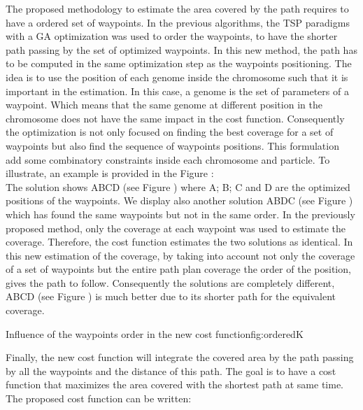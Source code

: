 The proposed methodology to estimate the area covered by the path requires to have a ordered set of waypoints.  In the previous algorithms, the TSP paradigms with a GA optimization was used to order the waypoints, to have the shorter path passing by the set of optimized waypoints. In this new method, the path has to be computed in the same optimization step as the waypoints positioning. 
The idea is to use the position of each genome inside the chromosome such that it is important in the estimation. In this case, a genome is the set of parameters of a waypoint. Which means that the same genome at different position in the chromosome does not have the same impact in the cost function. Consequently the optimization is not only focused on finding the best coverage for a set of waypoints but also find the sequence of waypoints positions. This formulation add some combinatory constraints inside each chromosome and particle.
To illustrate, an example is provided in the Figure  : \\
The solution shows ABCD (see Figure ) where A; B; C and D are the optimized positions of the waypoints. We display also another solution  ABDC (see Figure ) which has found the same waypoints but not in the same order. In the previously proposed method, only the coverage at each waypoint was used to estimate the coverage. Therefore, the cost function estimates the two solutions as identical. 
In this new estimation of the coverage, by taking into account not only the coverage of a set of waypoints but the entire path plan coverage the order of the position, gives the path to follow. Consequently the solutions are completely different, ABCD (see Figure ) is much better due to its shorter path for the equivalent coverage.
  \begin{mfigures}[!]{Influence of the waypoints order in the new cost function}{fig:orderedK} \centering
\end{mfigures}   

 Finally, the new cost function will integrate the covered area by the path passing  by all the waypoints and the distance of this path. The goal is to have a cost function that maximizes the area covered with the shortest path at same time.
 The proposed cost function can be written:
 

